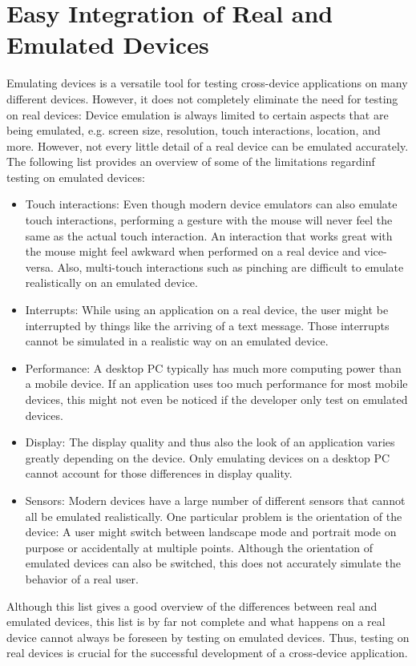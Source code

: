 \section{Easy Integration of Real and Emulated Devices}

Emulating devices is a versatile tool for testing cross-device applications on many different devices. However, it does not completely eliminate the need for testing on real devices: Device emulation is always limited to certain aspects that are being emulated, e.g. screen size, resolution, touch interactions, location, and more. However, not every little detail of a real device can be emulated accurately. The following list provides an overview of some of the limitations regardinf testing on emulated devices:
\begin{itemize}
	\item Touch interactions: Even though modern device emulators can also emulate touch interactions, performing a gesture with the mouse will never feel the same as the actual touch interaction. An interaction that works great with the mouse might feel awkward when performed on a real device and vice-versa. Also, multi-touch interactions such as pinching are difficult to emulate realistically on an emulated device.
	\item Interrupts: While using an application on a real device, the user might be interrupted by things like the arriving of a text message. Those interrupts cannot be simulated in a realistic way on an emulated device.
	\item Performance: A desktop PC typically has much more computing power than a mobile device. If an application uses too much performance for most mobile devices, this might not even be noticed if the developer only test on emulated devices.
	\item Display: The display quality and thus also the look of an application varies greatly depending on the device. Only emulating devices on a desktop PC cannot account for those differences in display quality. 
	\item Sensors: Modern devices have a large number of different sensors that cannot all be emulated realistically. One particular problem is the orientation of the device: A user might switch between landscape mode and portrait mode on purpose or accidentally at multiple points. Although the orientation of emulated devices can also be switched, this does not accurately simulate the behavior of a real user.
\end{itemize}
Although this list gives a good overview of the differences between real and emulated devices, this list is by far not complete and what happens on a real device cannot always be foreseen by testing on emulated devices. Thus, testing on real devices is crucial for the successful development of a cross-device application. 

